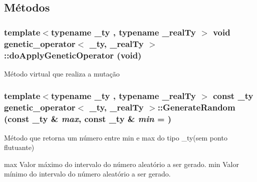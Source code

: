 \subsection{Métodos}
\hypertarget{classgenetic__operator_a70569d059114efa73bcd45a264953d13}{
\subsubsection[{doApplyGeneticOperator}]{\setlength{\rightskip}{0pt plus 5cm}template$<$typename \_\-ty , typename \_\-realTy $>$ void {\bf genetic\_\-operator}$<$ \_\-ty, \_\-realTy $>$::doApplyGeneticOperator (void)}}
\label{classgenetic__operator_a70569d059114efa73bcd45a264953d13}
Método virtual que realiza a mutação \hypertarget{classgenetic__operator_ad9f7ea3ff91063cde8959794b1ac5679}{
\subsubsection[{GenerateRandom}]{\setlength{\rightskip}{0pt plus 5cm}template$<$typename \_\-ty , typename \_\-realTy $>$ const \_\-ty {\bf genetic\_\-operator}$<$ \_\-ty, \_\-realTy $>$::GenerateRandom (const \_\-ty \& {\em max}, \/  const \_\-ty \& {\em min} = {})}}
\label{classgenetic__operator_ad9f7ea3ff91063cde8959794b1ac5679}
Método que retorna um número entre min e max do tipo \_\-ty(sem ponto flutuante)

max Valor máximo do intervalo do número aleatório a ser gerado.  min Valor mínimo do intervalo do número aleatório a ser gerado.

